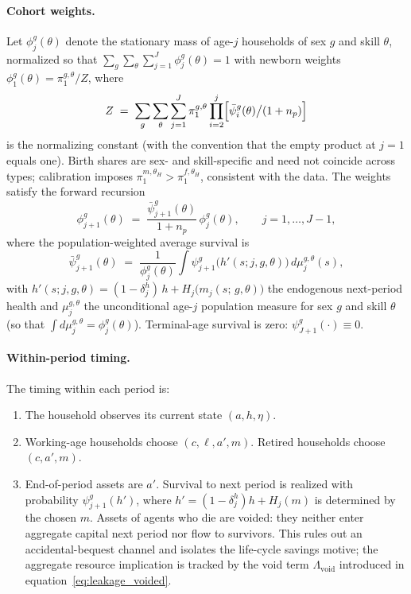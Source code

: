 \documentclass[12pt,a4paper]{article}
\begin{document}
\paragraph{Cohort weights.}
Let $\phi_j^{g}(\theta)$ denote the stationary mass of age-$j$ households of sex $g$ and skill $\theta$, normalized so that $\sum_g \sum_\theta \sum_{j=1}^{J} \phi_{j}^{g}(\theta) = 1$ with newborn weights $\phi_{1}^{g}(\theta) = \pi^{g,\theta}_1 / Z$, where
\[
Z \;=\; \sum_{g}\sum_{\theta}\sum_{j=1}^{J} \pi^{g,\theta}_1 \prod_{i=2}^{j} \Bigl[\bar\psi_i^{g}(\theta) \big/ (1+n_p)\Bigr]
\]
is the normalizing constant (with the convention that the empty product at $j=1$ equals one). Birth shares are sex- and skill-specific and need not coincide across types; calibration imposes $\pi^{m,\theta_H}_1 > \pi^{f,\theta_H}_1$, consistent with the data. The weights satisfy the forward recursion
\begin{equation}
\label{eq:cohort_weights}
\phi_{j+1}^{g}(\theta) \;=\; \frac{\bar{\psi}_{j+1}^{g}(\theta)}{1 + n_p}\, \phi_{j}^{g}(\theta), \qquad j = 1, \ldots, J-1,
\end{equation}
where the population-weighted average survival is
\begin{equation}
\label{eq:avg_survival}
\bar{\psi}_{j+1}^{g}(\theta)
\;=\;
\frac{1}{\phi_{j}^{g}(\theta)} \int \psi_{j+1}^{g}\bigl(h'(s; j, g, \theta)\bigr)\, d\mu_j^{g,\theta}(s),
\end{equation}
with $h'(s; j, g, \theta) = (1-\delta_j^h)\, h + H_j\bigl(m_j(s;\, g, \theta)\bigr)$ the endogenous next-period health and $\mu_{j}^{g,\theta}$ the unconditional age-$j$ population measure for sex $g$ and skill $\theta$ (so that $\int d\mu_{j}^{g,\theta} = \phi_{j}^{g}(\theta)$). Terminal-age survival is zero: $\psi_{J+1}^{g}(\cdot) \equiv 0$.

\paragraph{Within-period timing.}
The timing within each period is:
\begin{enumerate}
\item The household observes its current state $(a, h, \eta)$.
\item Working-age households choose $(c, \ell, a', m)$. Retired households choose $(c, a', m)$.
\item End-of-period assets are $a'$. Survival to next period is realized with probability $\psi_{j+1}^{g}(h')$, where $h' = (1-\delta_j^h) h + H_j(m)$ is determined by the chosen $m$. Assets of agents who die are voided: they neither enter aggregate capital next period nor flow to survivors. This rules out an accidental-bequest channel and isolates the life-cycle savings motive; the aggregate resource implication is tracked by the void term $\Lambda_{\mathrm{void}}$ introduced in equation~\eqref{eq:leakage_voided}.
\end{enumerate}
\end{document}

